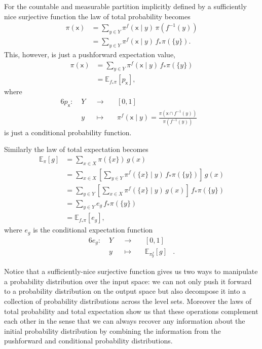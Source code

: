 \documentclass[
  letterpaper,
  DIV=11,
  numbers=noendperiod]{scrartcl}
\begin{document}
For the countable and measurable partition implicitly defined by a
sufficiently nice surjective function the law of total probability
becomes \begin{align*}
\pi( \mathsf{x} )
&=
\sum_{ y \in Y }
\pi^{f}( \mathsf{x} \mid y ) \, \pi(f^{-1}(y))
\\
&=
\sum_{ y \in Y }
\pi^{f}( \mathsf{x} \mid y ) \, f_{*} \pi( \{ y \} ).
\end{align*} This, however, is just a pushforward expectation value,
\begin{align*}
\pi( \mathsf{x} )
&=
\sum_{ y \in Y }
\pi^{f}( \mathsf{x} \mid y ) \, f_{*} \pi( \{ y \} )
\\
&=
\mathbb{E}_{f_{*}\pi} [ p_{\mathsf{x}} ],
\end{align*} where \begin{alignat*}{6}
p_{\mathsf{x}} :\; &Y& &\rightarrow& \; &[0, 1]&
\\
&y& &\mapsto& &\pi^{f}( \mathsf{x} \mid y ) =
\frac{ \pi(\mathsf{x} \cap f^{-1}(y)) }{ \pi(f^{-1}(y)) }&
\end{alignat*} is just a conditional probability function.

Similarly the law of total expectation becomes \begin{align*}
\mathbb{E}_{\pi}[ g ]
&=
\sum_{ x \in X } \pi( \{ x \} ) \, g(x)
\\
&=
\sum_{ x \in X }
\left[ \sum_{ y \in Y }
\pi^{f}( \{ x \} \mid y ) \, f_{*} \pi( \{ y \} )
\right] \, g(x)
\\
&=
\sum_{ y \in Y }
\left[
\sum_{ x \in X }
\pi^{f}( \{ x \} \mid y ) \, g(x)
\right] \, f_{*} \pi( \{ y \} )
\\
&=
\sum_{ y \in Y }
e_{g} \, f_{*} \pi( \{ y \} )
\\
&=
\mathbb{E}_{ f_{*} \pi } [ e_{g} ],
\end{align*} where \(e_{g}\) is the conditional expectation function
\begin{alignat*}{6}
e_{g} :\; &Y& &\rightarrow& \; &[0, 1]&
\\
&y& &\mapsto& & \mathbb{E}_{\pi^{f}_{y} }[ g ] &.
\end{alignat*}

Notice that a sufficiently-nice surjective function gives us two ways to
manipulate a probability distribution over the input space: we can not
only push it forward to a probability distribution on the output space
but also decompose it into a collection of probability distributions
across the level sets. Moreover the laws of total probability and total
expectation show us that these operations complement each other in the
sense that we can always recover any information about the initial
probability distribution by combining the information from the
pushforward and conditional probability distributions.
\end{document}
